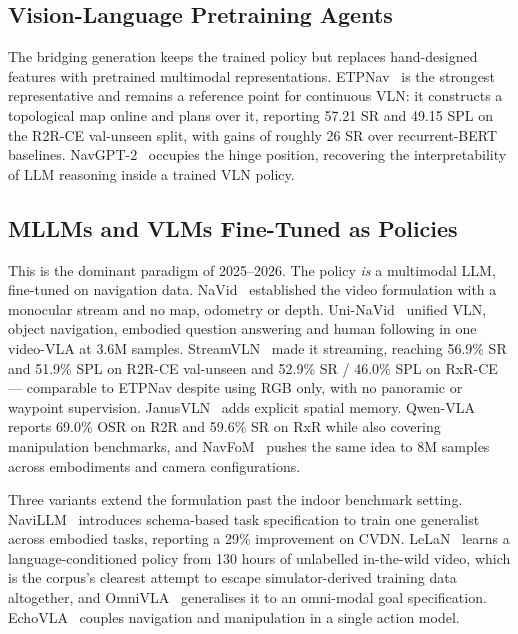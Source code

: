 \documentclass[journal]{IEEEtran}
\begin{document}
\subsection{Vision-Language Pretraining Agents}
The bridging generation keeps the trained policy but replaces hand-designed
features with pretrained multimodal representations.
ETPNav~\cite{an2025etpnav} is the strongest representative and remains a
reference point for continuous VLN: it constructs a topological map online
and plans over it, reporting 57.21 SR and 49.15 SPL on the R2R-CE val-unseen
split, with gains of roughly 26 SR over recurrent-BERT baselines.
NavGPT-2~\cite{zhou2024navgpt} occupies the hinge position, recovering the
interpretability of LLM reasoning inside a trained VLN policy.

\subsection{MLLMs and VLMs Fine-Tuned as Policies}
This is the dominant paradigm of 2025--2026. The policy \emph{is} a
multimodal LLM, fine-tuned on navigation data.
NaVid~\cite{zhang2024navid} established the video formulation with a
monocular stream and no map, odometry or depth.
Uni-NaVid~\cite{zhang2024navidb} unified VLN, object navigation, embodied
question answering and human following in one video-VLA at 3.6M samples.
StreamVLN~\cite{wei2025streamvln} made it streaming, reaching 56.9\% SR and
51.9\% SPL on R2R-CE val-unseen and 52.9\% SR / 46.0\% SPL on RxR-CE ---
comparable to ETPNav despite using RGB only, with no panoramic or waypoint
supervision. JanusVLN~\cite{zeng2025janusvln} adds explicit spatial memory.
Qwen-VLA~\cite{wang2026qwen} reports 69.0\% OSR on R2R and 59.6\% SR on RxR
while also covering manipulation benchmarks, and
NavFoM~\cite{zhang2025embodied} pushes the same idea to 8M samples across
embodiments and camera configurations.

Three variants extend the formulation past the indoor benchmark setting.
NaviLLM~\cite{zheng2024towards} introduces schema-based task specification to
train one generalist across embodied tasks, reporting a 29\% improvement on
CVDN. LeLaN~\cite{hirose2024lelan} learns a language-conditioned policy from
130 hours of unlabelled in-the-wild video, which is the corpus's clearest
attempt to escape simulator-derived training data altogether, and
OmniVLA~\cite{hirose2025omnivla} generalises it to an omni-modal goal
specification. EchoVLA~\cite{lin2025echovla} couples navigation and
manipulation in a single action model.
\end{document}

